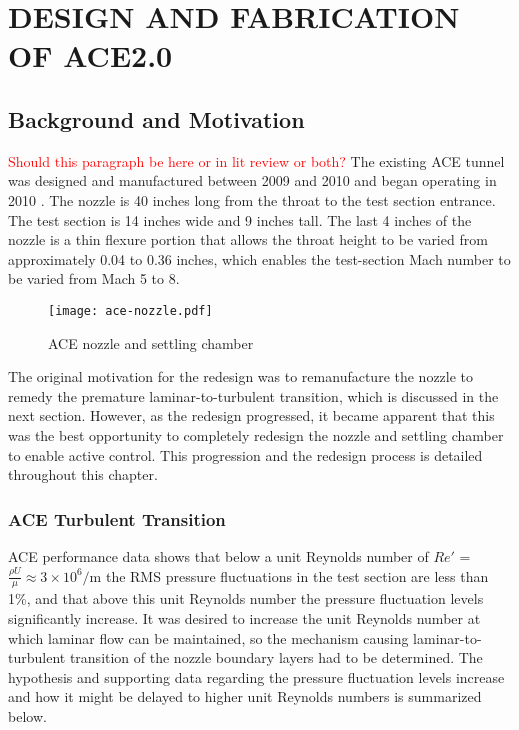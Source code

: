 %
%  
%



\chapter{DESIGN AND FABRICATION OF ACE2.0}

\section{Background and Motivation}

\textcolor{red}{Should this paragraph be here or in lit review or both?} The existing ACE tunnel was designed and manufactured between 2009 and 2010 and began operating in 2010 \cite{ace09,ace10-calibrate,tichenor-dis}. The nozzle is 40 inches long from the throat to the test section entrance. The test section is 14 inches wide and 9 inches tall. The last 4 inches of the nozzle is a thin flexure portion that allows the throat height to be varied from approximately 0.04 to 0.36 inches, which enables the test-section Mach number to be varied from Mach 5 to 8.

\begin{figure}[ht!]
    \centering
    \texttt{[image: ace-nozzle.pdf]}
    \caption{ACE nozzle and settling chamber}
    \label{fig:ace-nozzle}
\end{figure}

The original motivation for the redesign was to remanufacture the nozzle to remedy the premature laminar-to-turbulent transition, which is discussed in the next section. However, as the redesign progressed, it became apparent that this was the best opportunity to completely redesign the nozzle and settling chamber to enable active control. This progression and the redesign process is detailed throughout this chapter.

\subsection{ACE Turbulent Transition}

ACE performance data \cite{aceturb,mai-dis,neel-dis,leidy-dis} shows that below a unit Reynolds number of $Re'$ = $\frac{\rho U}{\mu} \approx 3 \times 10^6/\mathrm{m}$ the RMS pressure fluctuations in the test section are less than 1\%, and that above this unit Reynolds number the pressure fluctuation levels significantly increase. It was desired to increase the unit Reynolds number at which laminar flow can be maintained, so the mechanism causing laminar-to-turbulent transition of the nozzle boundary layers had to be determined. The hypothesis and supporting data regarding the pressure fluctuation levels increase and how it might be delayed to higher unit Reynolds numbers is summarized below.


